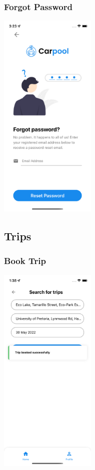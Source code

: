 \documentclass[hidelinks, 12pt, a4paper]{article}
\begin{document}
\subsubsection{Forgot Password}
\begin{center}
  \includegraphics[height=10cm]{images/Simulator Screen Shot - iPhone X - 2022-06-10 at 03.23.17.png}
\end{center}
\vspace{1cm}

\subsection{Trips}
\subsubsection{Book Trip}
\begin{center}
  \includegraphics[height=10cm]{images/book_trip.png}
\end{center}
\end{document}
